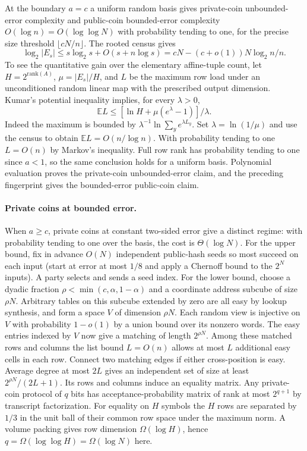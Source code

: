 \documentclass[11pt]{article}
\begin{document}
At the boundary $a=c$ a uniform random basis gives private-coin unbounded-error complexity and public-coin bounded-error complexity $O(\log n)=O(\log\log N)$ with probability tending to one, for the precise size threshold $\lfloor cN/n\rfloor$. The rooted census gives
\[
 \log_2 |E_s|\le s\log_2 s+O(s+n\log s)
 = cN-(c+o(1))N\log_2 n/n .
\]
To see the quantitative gain over the elementary affine-tuple count, let $H=2^{\mathrm{rank}(A)}$, $\mu=|E_s|/H$, and $L$ be the maximum row load under an unconditioned random linear map with the prescribed output dimension. Kumar's potential inequality \cite[eq.~(1)]{load} implies, for every $\lambda>0$,
\[
 \mathbb E L\le[\ln H+\mu(e^\lambda-1)]/\lambda .
\]
Indeed the maximum is bounded by $\lambda^{-1}\ln\sum_y e^{\lambda L_y}$. Set $\lambda=\ln(1/\mu)$ and use the census to obtain $\mathbb E L=O(n/\log n)$. With probability tending to one $L=O(n)$ by Markov's inequality. Full row rank has probability tending to one since $a<1$, so the same conclusion holds for a uniform basis. Polynomial evaluation proves the private-coin unbounded-error claim, and the preceding fingerprint gives the bounded-error public-coin claim.

\paragraph{Private coins at bounded error.}
When $a\ge c$, private coins at constant two-sided error give a distinct regime: with probability tending to one over the basis, the cost is $\Theta(\log N)$. For the upper bound, fix in advance $O(N)$ independent public-hash seeds so most succeed on each input (start at error at most $1/8$ and apply a Chernoff bound to the $2^N$ inputs). A party selects and sends a seed index. For the lower bound, choose a dyadic fraction $\rho<\min(c,\alpha,1-\alpha)$ and a coordinate address subcube of size $\rho N$. Arbitrary tables on this subcube extended by zero are all easy by lookup synthesis, and form a space $V$ of dimension $\rho N$. Each random view is injective on $V$ with probability $1-o(1)$ by a union bound over its nonzero words. The easy entries indexed by $V$ now give a matching of length $2^{\rho N}$. Among these matched rows and columns the list bound $L=O(n)$ allows at most $L$ additional easy cells in each row. Connect two matching edges if either cross-position is easy. Average degree at most $2L$ gives an independent set of size at least $2^{\rho N}/(2L+1)$. Its rows and columns induce an equality matrix. Any private-coin protocol of $q$ bits has acceptance-probability matrix of rank at most $2^{q+1}$ by transcript factorization. For equality on $H$ symbols the $H$ rows are separated by $1/3$ in the unit ball of their common row space under the maximum norm. A volume packing gives row dimension $\Omega(\log H)$, hence $q=\Omega(\log\log H)=\Omega(\log N)$ here.
\end{document}
